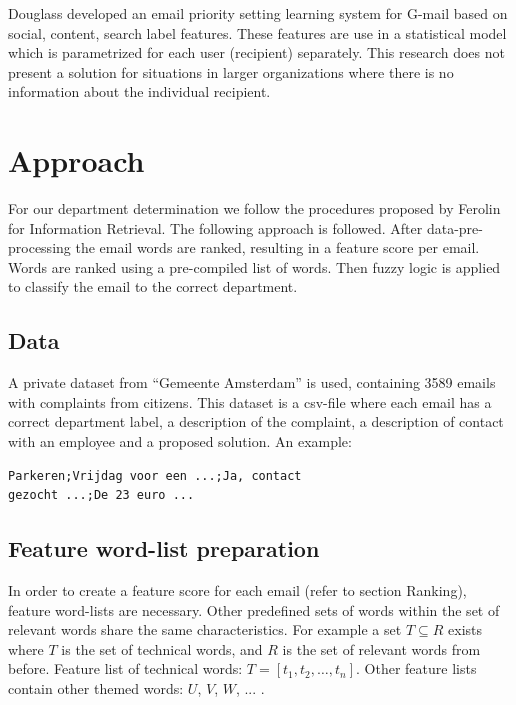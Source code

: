 \documentclass[journal]{IEEEtran}
\begin{document}
Douglass \cite{ranking} developed an email priority setting learning system for G-mail based on social, content, search label features. These features are use in a statistical model which is parametrized for each user (recipient) separately. This research does not present a solution for situations in larger organizations where there is no information about the individual recipient.

\section{Approach}
For our department determination we follow the procedures proposed by Ferolin for Information Retrieval. The following approach is followed. After data-pre-processing the email words are ranked, resulting in a feature score per email. Words are ranked using a pre-compiled list of words. Then fuzzy logic is applied to classify the email to the correct department.

\subsection{Data}

A private dataset from ``Gemeente Amsterdam'' is used, containing 3589 emails with complaints from citizens.
This dataset is a csv-file where each email has a correct department label, a description of the complaint, a description of contact with an employee and a proposed solution.
An example:
\begin{lstlisting}
Parkeren;Vrijdag voor een ...;Ja, contact
gezocht ...;De 23 euro ...
\end{lstlisting}

\subsection{Feature word-list preparation}

In order to create a feature score for each email (refer to section Ranking), feature word-lists are necessary. Other predefined sets of words within the set of relevant words share the same characteristics. For example a set $T \subseteq R$ exists where $T$
is the set of technical words, and $R$ is the set of relevant words from before. Feature list of technical words: $T = [t_1, t_2, \dots, t_n]$.
Other feature lists contain other themed words: $U$, $V$, $W$, ... .\\
\end{document}
